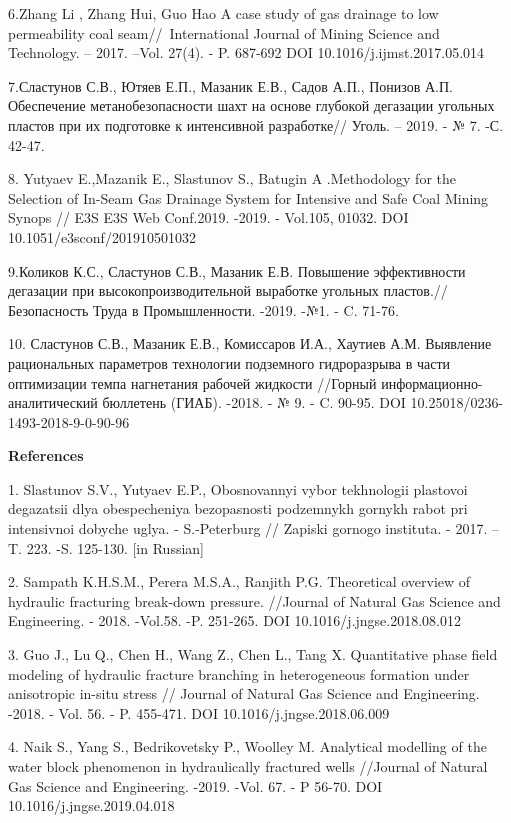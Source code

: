 6.Zhang Li , Zhang Hui, Guo Hao A case study of gas drainage to low
permeability coal seam//~International Journal of Mining Science and
Technology. -- 2017. --Vol. 27(4). - P. 687-692 DOI
10.1016/j.ijmst.2017.05.014

7.Сластунов С.В., Ютяев Е.П., Мазаник Е.В., Садов А.П., Понизов А.П.
Обеспечение метанобезопасности шахт на основе глубокой дегазации
угольных пластов при их подготовке к интенсивной разработке// Уголь. --
2019. - № 7. -С. 42-47.

8. Yutyaev E.,Mazanik E., Slastunov S., Batugin A .Methodology for the
Selection of In-Seam Gas Drainage System for Intensive and Safe Coal
Mining Synops // E3S E3S Web Conf.2019. -2019. - Vol.105, 01032. DOI
10.1051/e3sconf/201910501032

9.Коликов К.С., Сластунов С.В., Мазаник Е.В. Повышение эффективности
дегазации при высокопроизводительной выработке угольных пластов.//
Безопасность Труда в Промышленности. -2019. -№1. - C. 71-76.

10. Сластунов С.В., Мазаник Е.В., Комиссаров И.А., Хаутиев А.М.
Выявление рациональных параметров технологии подземного гидроразрыва в
части оптимизации темпа нагнетания рабочей жидкости //Горный
информационно-аналитический бюллетень (ГИАБ). -2018. - № 9. - C. 90-95.
DOI 10.25018/0236-1493-2018-9-0-90-96

{\bfseries References}

1. Slastunov S.V., Yutyaev E.P., Obosnovannyi vybor tekhnologii
plastovoi degazatsii dlya obespecheniya bezopasnosti podzemnykh gornykh
rabot pri intensivnoi dobyche uglya. - S.-Peterburg // Zapiski gornogo
instituta. - 2017. --T. 223. -S. 125-130. {[}in Russian{]}

2. Sampath K.H.S.M., Perera M.S.A., Ranjith P.G. Theoretical overview of
hydraulic fracturing break-down pressure. //Journal of Natural Gas
Science and Engineering. - 2018. -Vol.58. -P. 251-265. DOI
10.1016/j.jngse.2018.08.012

3. Guo J., Lu Q., Chen H., Wang Z., Chen L., Tang X. Quantitative phase
field modeling of hydraulic fracture branching in heterogeneous
formation under anisotropic in-situ stress // Journal of Natural Gas
Science and Engineering. -2018. - Vol. 56. - P. 455-471. DOI
10.1016/j.jngse.2018.06.009

4. Naik S., Yang S., Bedrikovetsky P., Woolley M. Analytical modelling
of the water block phenomenon in hydraulically fractured wells //Journal
of Natural Gas Science and Engineering. -2019. -Vol. 67. - P 56-70. DOI
10.1016/j.jngse.2019.04.018

